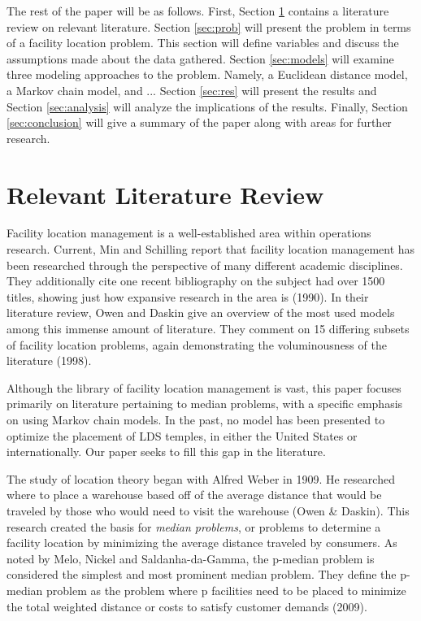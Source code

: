 \documentclass[twoside,twocolumn]{article}
\begin{document}
The rest of the paper will be as follows.
First, Section \ref{sec:litrev} contains a literature review on relevant literature.
Section \ref{sec:prob} will present the problem in terms of a facility location problem.
This section will define variables and discuss the assumptions made about the data gathered.
Section \ref{sec:models} will examine three modeling approaches to the problem.
Namely, a Euclidean distance model, a Markov chain model, and ... %
Section \ref{sec:res} will present the results and Section \ref{sec:analysis} will analyze the implications of the results.
Finally, Section \ref{sec:conclusion} will give a summary of the paper along with areas for further research.

\section{Relevant Literature Review}
\label{sec:litrev}
Facility location management is a well-established area within operations research. Current, Min and Schilling report that facility location management has been researched through the perspective of many different academic disciplines. They additionally cite one recent bibliography on the subject had over 1500 titles, showing just how expansive research in the area is (1990).
In their literature review, Owen and Daskin give an overview of the most used models among this immense amount of literature. 
They comment on 15 differing subsets of facility location problems, again demonstrating the voluminousness of the literature (1998).

Although the library of facility location management is vast, this paper focuses primarily on literature pertaining to median problems, with a specific emphasis on using Markov chain models. In the past, no model has been presented to optimize the placement of LDS temples, in either the United States or internationally. Our paper seeks to fill this gap in the literature.

The study of location theory began with Alfred Weber in 1909. 
He researched where to place a warehouse based off of the average distance that would be traveled by those who would need to visit the warehouse (Owen \& Daskin).
This research created the basis for {\em median problems}, or problems to determine a facility location by minimizing the average distance traveled by consumers.
As noted by Melo, Nickel and Saldanha-da-Gamma, the p-median problem is considered the simplest and most prominent median problem. They define the p-median problem as the problem where p facilities need to be placed to minimize the total weighted distance or costs to satisfy customer demands (2009).
\end{document}
